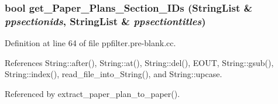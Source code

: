 \subsubsection{\setlength{\rightskip}{0pt plus 5cm}bool get\_\-Paper\_\-Plans\_\-Section\_\-IDs ({\bf String\-List} \& {\em ppsectionids}, {\bf String\-List} \& {\em ppsectiontitles})}\label{ppfilter_8pre-blank_8cc_a2}




Definition at line 64 of file ppfilter.pre-blank.cc.

References String::after(), String::at(), String::del(), EOUT, String::gsub(), String::index(), read\_\-file\_\-into\_\-String(), and String::upcase.

Referenced by extract\_\-paper\_\-plan\_\-to\_\-paper().



